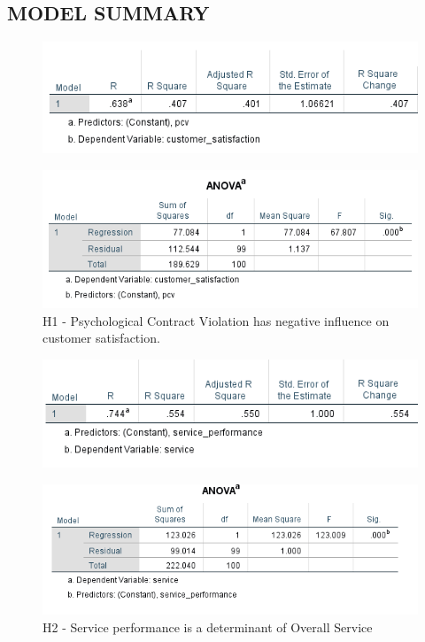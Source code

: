 \documentclass[a4paper, 14pt]{article}
\begin{document}
{\subsection*{MODEL SUMMARY}
\begin{figure}[H]
\centering
\includegraphics[scale=1]{pcv_vs_customer_satisfaction.png}
\end{figure}

\begin{figure}[H]
\centering
\includegraphics[scale=1]{anova_pcv_cs.png}
\caption{H1 - Psychological Contract Violation has negative influence on customer satisfaction.}
\end{figure}


\begin{figure}[H]
\centering
\includegraphics[scale=1]{service_performance_vs_service.png}
\end{figure}

\begin{figure}[H]
\centering
\includegraphics[scale=1]{anova_s_sp.png}
\caption{H2 - Service performance is a determinant of Overall Service}
\end{figure}


}
\end{document}
